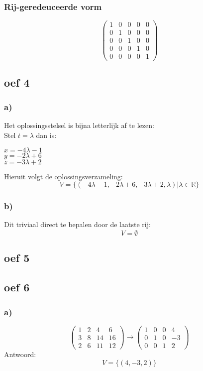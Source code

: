 \documentclass[10pt,a4paper]{article}
\begin{document}
\subsubsection*{Rij-geredeuceerde vorm}
\[
\begin{pmatrix}
1 &  0 &  0 &  0 & 0\\
0 &  1 &  0 &  0 & 0\\
0 &  0 &  1 &  0 & 0\\
0 &  0 &  0 &  1 & 0\\
0 &  0 &  0 &  0 & 1 
\end{pmatrix}
\]

\subsection*{oef 4}
\subsubsection*{a)}
Het oplossingsstelsel is bijna letterlijk af te lezen:\\
Stel $t=\lambda$ dan is:\\
\begin{center}
$x = -4\lambda - 1$\\
$y = -2\lambda + 6$\\
$z = -3\lambda + 2$\\
\end{center}
Hieruit volgt de oplossingsverzameling:
\[
V=\{(-4\lambda - 1,-2\lambda + 6,-3\lambda + 2, \lambda)|\lambda \in \mathbb{R}\}
\]
\subsubsection*{b)}
Dit triviaal direct te bepalen door de laatste rij:
\[
V=\emptyset
\]
\subsection*{oef 5}

\subsection*{oef 6}
\subsubsection*{a)}
\[
\begin{pmatrix}
1 &  2 &  4 &  6\\
3 &  8 & 14 & 16\\
2 &  6 & 11 & 12
\end{pmatrix}
\longrightarrow
\begin{pmatrix}
1 &  0 &  0 &  4\\
0 &  1 &  0 & -3\\
0 &  0 &  1 &  2
\end{pmatrix}
\]
Antwoord:
\[
V=\{(4,-3,2)\}
\]
\end{document}

